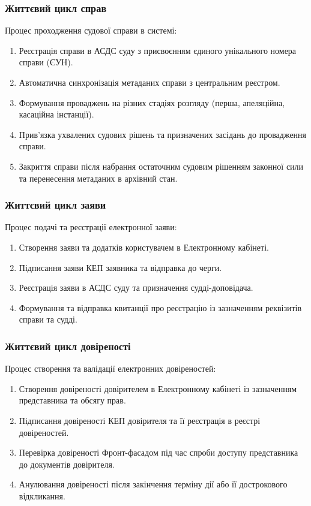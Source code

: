 \documentclass{article}
\begin{document}
\subsubsection{Життєвий цикл справ}
Процес проходження судової справи в системі:
\begin{enumerate}
    \item Реєстрація справи в АСДС суду з присвоєнням єдиного унікального номера справи (ЄУН).
    \item Автоматична синхронізація метаданих справи з центральним реєстром.
    \item Формування проваджень на різних стадіях розгляду (перша, апеляційна, касаційна інстанції).
    \item Прив'язка ухвалених судових рішень та призначених засідань до провадження справи.
    \item Закриття справи після набрання остаточним судовим рішенням законної сили та перенесення метаданих в архівний стан.
\end{enumerate}

\subsubsection{Життєвий цикл заяви}
Процес подачі та реєстрації електронної заяви:
\begin{enumerate}
    \item Створення заяви та додатків користувачем в Електронному кабінеті.
    \item Підписання заяви КЕП заявника та відправка до черги.
    \item Реєстрація заяви в АСДС суду та призначення судді-доповідача.
    \item Формування та відправка квитанції про реєстрацію із зазначенням реквізитів справи та судді.
\end{enumerate}

\subsubsection{Життєвий цикл довіреності}
Процес створення та валідації електронних довіреностей:
\begin{enumerate}
    \item Створення довіреності довірителем в Електронному кабінеті із зазначенням представника та обсягу прав.
    \item Підписання довіреності КЕП довірителя та її реєстрація в реєстрі довіреностей.
    \item Перевірка довіреності Фронт-фасадом під час спроби доступу представника до документів довірителя.
    \item Анулювання довіреності після закінчення терміну дії або її дострокового відкликання.
\end{enumerate}
\end{document}
